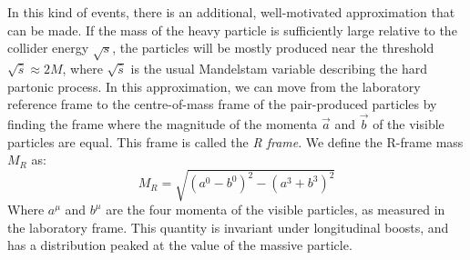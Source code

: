 In this kind of events, there is an additional, well-motivated approximation
that can be made. If the mass of the heavy particle is sufficiently large
relative to the collider energy $\sqrt{s}$, the particles will be mostly
produced near the threshold $\sqrt{\hat s} \approx 2M$, where
$\sqrt{\hat s}$ is the usual Mandelstam variable describing the hard
partonic process.
In this approximation, we can move from the laboratory reference frame to
the centre-of-mass frame of the pair-produced particles by finding the frame
where the magnitude of the momenta $\vec a$ and $\vec b$ of the visible particles are equal. This
frame is called the \emph{R frame}.
We define the R-frame mass $M_R$ as:
\begin{equation*}
            M_R = \sqrt{(a^0 - b^0)^2 - (a^3 + b^3)^2}
\end{equation*}
Where $a^\mu$ and $b^\mu$ are the four momenta of the visible particles, as
measured in the laboratory frame.
This quantity is invariant under longitudinal boosts, and has a distribution
peaked at the value of the massive particle.

